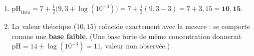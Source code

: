 \documentclass[11pt,a4paper]{article}
\begin{document}
\begin{corrige}
\begin{enumerate}[label=\alph*)]
  \item $\mathrm{pH}_{\text{théo}} = 7 + \tfrac12\bigl(9{,}3 + \log(10^{-3})\bigr) = 7 + \tfrac12(9{,}3 - 3)
        = 7 + 3{,}15 = \mathbf{10{,}15}$.
  \item La valeur théorique ($10{,}15$) coïncide exactement avec la mesure :  se comporte comme une
        \textbf{base faible}. (Une base forte de même concentration donnerait $\mathrm{pH} = 14 + \log(10^{-3})
        = 11$, valeur non observée.)
\end{enumerate}
\end{corrige}
\end{document}
